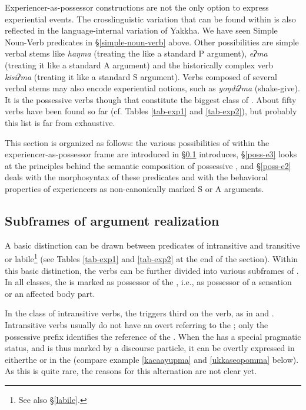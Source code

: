 Experiencer-as-possessor constructions are not the only option to express experiential events. The crosslinguistic variation that can be found within  is also reflected in the language-internal variation of Yakkha. We have seen Simple Noun-Verb predicates in §\ref{simple-noun-verb} above. Other possibilities are simple verbal stems like \emph{haŋma}  (treating the  like a standard P argument), \emph{eʔma}  (treating it like a standard A argument) and the  historically complex  verb \emph{kisiʔma}  (treating it like a standard S argument). Verbs composed of several verbal stems may also encode experiential notions, such as \emph{yoŋdiʔma}  (shake-give). It is the  possessive  verbs though that constitute the biggest class of . About  fifty verbs have been found so far (cf. Tables \ref{tab-exp1} and \ref{tab-exp2}), but probably this list is far from exhaustive. 

This section is organized as follows:  the various possibilities of  within the experiencer-as-possessor frame are introduced in §\ref{poss-e1} introduces, §\ref{poss-e3} looks at the principles behind the semantic composition of possessive , and §\ref{poss-e2} deals with the morphosyntax of these predicates and with the behavioral properties of experiencers as non-canonically marked S or A arguments. 


\subsection{Subframes of argument realization}\label{poss-e1}

A basic distinction can be drawn between predicates of intransitive  and transitive or labile\footnote{See also §\ref{labile}.}  (see Tables \ref{tab-exp1} and  \ref{tab-exp2} at the end of the section). Within this  basic distinction, the verbs can be further divided into various subframes of . In all classes, the  is marked as possessor of the , i.e., as possessor of a sensation or an affected body part.

In the class of intransitive verbs, the  triggers third  on the verb, as in \Last and \Next. Intransitive verbs usually do not have an overt  referring to the ; only the possessive prefix identifies the reference of the . When the  has a special pragmatic status, and is thus marked by a discourse particle, it can be overtly expressed  in eitherthe  or in the  (compare example \ref{kacaayupma} and \ref{ukkaseopomma} below). As this is quite rare, the reasons for this alternation are not clear yet.

